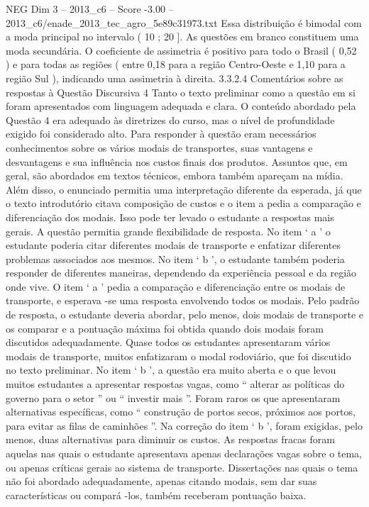 \begin{textsample}{NEG Dim 3 – 2013\_c6 – Score -3.00 – 2013\_c6/enade\_2013\_tec\_agro\_5e89c31973.txt}
Essa distribuição é bimodal com a moda principal no intervalo ( 10 ; 20 ].
As questões em branco constituem uma moda secundária.
O coeficiente de assimetria é positivo para todo o Brasil ( 0,52 ) e para todas as regiões ( entre 0,18 para a região Centro-Oeste e 1,10 para a região Sul ), indicando uma assimetria à direita. 3.3.2.4 Comentários sobre as respostas à Questão Discursiva 4 Tanto o texto preliminar como a questão em si foram apresentados com linguagem adequada e clara.
O conteúdo abordado pela Questão 4 era adequado às diretrizes do curso, mas o nível de profundidade exigido foi considerado alto.
Para responder à questão eram necessários conhecimentos sobre os vários modais de transportes, suas vantagens e desvantagens e sua influência nos custos finais dos produtos.
Assuntos que, em geral, são abordados em textos técnicos, embora também apareçam na mídia.
Além disso, o enunciado permitia uma interpretação diferente da esperada, já que o texto introdutório citava composição de custos e o item a pedia a comparação e diferenciação dos modais.
Isso pode ter levado o estudante a respostas mais gerais.
A questão permitia grande flexibilidade de resposta.
No item ‘ a ’ o estudante poderia citar diferentes modais de transporte e enfatizar diferentes problemas associados aos mesmos.
No item ‘ b ’, o estudante também poderia responder de diferentes maneiras, dependendo da experiência pessoal e da região onde vive.
O item ‘ a ’ pedia a comparação e diferenciação entre os modais de transporte, e esperava -se uma resposta envolvendo todos os modais.
Pelo padrão de resposta, o estudante deveria abordar, pelo menos, dois modais de transporte e os comparar e a pontuação máxima foi obtida quando dois modais foram discutidos adequadamente.
Quase todos os estudantes apresentaram vários modais de transporte, muitos enfatizaram o modal rodoviário, que foi discutido no texto preliminar.
No item ‘ b ’, a questão era muito aberta e o que levou muitos estudantes a apresentar respostas vagas, como “ alterar as políticas do governo para o setor ” ou “ investir mais ”.
Foram raros os que apresentaram alternativas específicas, como “ construção de portos secos, próximos aos portos, para evitar as filas de caminhões ”.
Na correção do item ‘ b ’, foram exigidas, pelo menos, duas alternativas para diminuir os custos.
As respostas fracas foram aquelas nas quais o estudante apresentava apenas declarações vagas sobre o tema, ou apenas críticas gerais ao sistema de transporte.
Dissertações nas quais o tema não foi abordado adequadamente, apenas citando modais, sem dar suas características ou compará -los, também receberam pontuação baixa.

\end{textsample}
